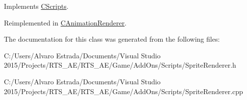 Implements \hyperlink{class_c_scripts_ad7567e93972e760eb0d307ad263923bb}{C\+Scripts}.



Reimplemented in \hyperlink{class_c_animation_renderer_a2ac2237cb706d2f6d45a88a86543e008}{C\+Animation\+Renderer}.



The documentation for this class was generated from the following files\+:\begin{DoxyCompactItemize}
\item 
C\+:/\+Users/\+Alvaro Estrada/\+Documents/\+Visual Studio 2015/\+Projects/\+R\+T\+S\+\_\+\+A\+E/\+R\+T\+S\+\_\+\+A\+E/\+Game/\+Add\+Ons/\+Scripts/Sprite\+Renderer.\+h\item 
C\+:/\+Users/\+Alvaro Estrada/\+Documents/\+Visual Studio 2015/\+Projects/\+R\+T\+S\+\_\+\+A\+E/\+R\+T\+S\+\_\+\+A\+E/\+Game/\+Add\+Ons/\+Scripts/Sprite\+Renderer.\+cpp\end{DoxyCompactItemize}
